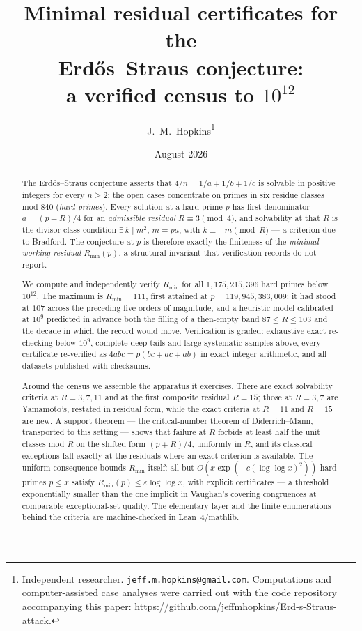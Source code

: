 \documentclass[11pt]{article}
\title{Minimal residual certificates for the\\
Erd\H{o}s--Straus conjecture:\\
a verified census to $10^{12}$}
\author{J.~M.\ Hopkins\thanks{Independent researcher.
\texttt{jeff.m.hopkins@gmail.com}.
Computations and computer-assisted case analyses were carried out with the
code repository accompanying this paper:
\url{https://github.com/jeffmhopkins/Erd-s-Straus-attack}.}}
\date{August 2026}
\theoremstyle{plain}
\theoremstyle{remark}
\theoremstyle{plain}
\numberwithin{equation}{section}
\begin{document}
\maketitle

\begin{abstract}
The Erd\H{o}s--Straus conjecture asserts that $4/n = 1/a+1/b+1/c$ is
solvable in positive integers for every $n \ge 2$; the open cases
concentrate on primes in six residue classes mod $840$ (\emph{hard
primes}). Every solution at a hard prime $p$ has first denominator
$a = (p+R)/4$ for an \emph{admissible residual} $R \equiv 3 \pmod 4$,
and solvability at that $R$ is the divisor-class condition
$\exists\, k \mid m^2$, $m = pa$, with $k \equiv -m \pmod R$ --- a
criterion due to Bradford. The conjecture at $p$ is therefore exactly
the finiteness of the \emph{minimal working residual}
$R_{\min}(p)$, a structural invariant that verification records do
not report.

We compute and independently verify $R_{\min}$ for all
$1{,}175{,}215{,}396$ hard primes below $10^{12}$. The maximum is
$R_{\min} = 111$, first attained at $p = 119{,}945{,}383{,}009$; it
had stood at $107$ across the preceding five orders of magnitude,
and a heuristic model calibrated at $10^9$ predicted in advance both
the filling of a then-empty band $87 \le R \le 103$ and the decade
in which the record would move. Verification is graded: exhaustive
exact re-checking below $10^9$, complete deep tails and large
systematic samples above, every certificate re-verified as
$4abc = p(bc+ac+ab)$ in exact integer arithmetic, and all datasets
published with checksums.

Around the census we assemble the apparatus it exercises. There are
exact solvability criteria at $R = 3, 7, 11$ and at the first
composite residual $R = 15$; those at $R = 3, 7$ are Yamamoto's,
restated in residual form, while the exact criteria at $R = 11$ and
$R = 15$ are new. A support theorem --- the critical-number theorem
of Diderrich--Mann, transported to this setting --- shows that
failure at $R$ forbids at least half the unit classes mod $R$ on the
shifted form $(p+R)/4$, uniformly in $R$, and its classical
exceptions fall exactly at the residuals where an exact criterion is
available. The uniform consequence bounds $R_{\min}$ itself: all but
$O(x\exp(-c(\log\log x)^2))$ hard primes $p \le x$ satisfy
$R_{\min}(p) \le \varepsilon\log\log x$, with explicit certificates
--- a threshold exponentially smaller than the one implicit in
Vaughan's covering congruences at comparable exceptional-set
quality. The elementary layer and the finite enumerations behind the
criteria are machine-checked in Lean~4/\mbox{mathlib}.
\end{abstract}
\end{document}
